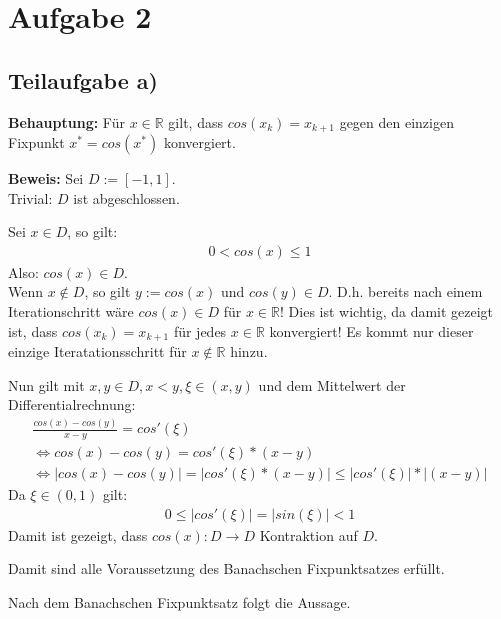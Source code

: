 \section*{Aufgabe 2}
\subsection*{Teilaufgabe a)}

\textbf{Behauptung:} Für $x \in \mathbb{R}$ gilt, dass $cos(x_k) = x_{k+1}$ gegen den einzigen Fixpunkt $x^{*} = cos(x^{*})$ konvergiert.

\textbf{Beweis:} 
Sei $ D := [-1, 1]$.\\
Trivial: $D$ ist abgeschlossen.

Sei $ x \in D$, so gilt:
\begin{align*}
	0 < cos(x) \leq 1
\end{align*}
Also: $cos(x) \in D$.\\ Wenn $x \not\in D$, so gilt $y := cos(x)$ und $cos(y) \in D$. D.h. bereits nach einem Iterationschritt wäre $cos(x) \in D$ für $x \in \mathbb{R}$! Dies ist wichtig, da damit gezeigt ist, dass $cos(x_k) = x_{k+1}$ für jedes $x \in \mathbb{R}$ konvergiert! Es kommt nur dieser einzige Iteratationsschritt für $x \not\in \mathbb{R}$ hinzu.

Nun gilt mit $ x, y \in D, x < y, \xi \in (x,y) $ und dem Mittelwert der Differentialrechnung:
\begin{align*}
	\frac{cos(x) - cos(y)}{x - y} = cos'(\xi) \\
	\Leftrightarrow cos(x) - cos(y) =  cos'(\xi) * (x - y)  \\
	\Leftrightarrow | cos(x) - cos(y) | = | cos'(\xi) * (x - y) | \leq | cos'(\xi) | * | (x - y) | 
\end{align*}
Da $ \xi \in (0, 1) $ gilt:
\begin{align*}
	0 \leq | cos'(\xi) | = | sin(\xi) | < 1 
\end{align*}
Damit ist gezeigt, dass $cos(x) : D \rightarrow D$ Kontraktion auf $D$.

Damit sind alle Voraussetzung des Banachschen Fixpunktsatzes erfüllt.

Nach dem Banachschen Fixpunktsatz folgt die Aussage.